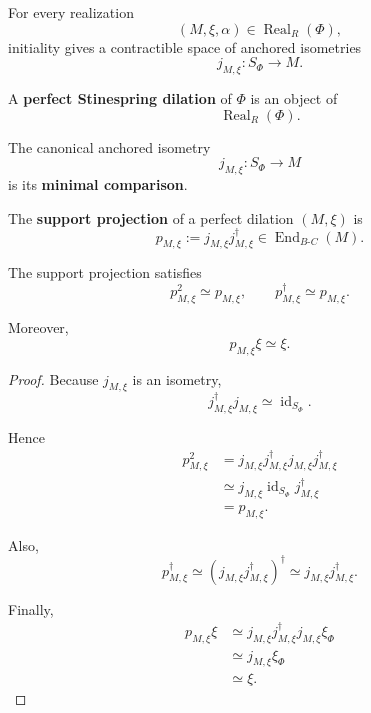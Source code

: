 For every realization
\[
  (M,\xi,\alpha)
  \in
  \operatorname{Real}_R(\Phi),
\]
initiality gives a contractible space of anchored isometries
\[
  j_{M,\xi}:
  S_\Phi\to M.
\]

\begin{definition}
\label{def:higher-perfect-stinespring-dilation}
A \textbf{perfect Stinespring dilation} of \(\Phi\) is an object of
\[
  \operatorname{Real}_R(\Phi).
\]

The canonical anchored isometry
\[
  j_{M,\xi}:S_\Phi\to M
\]
is its \textbf{minimal comparison}.
\end{definition}

\begin{definition}
\label{def:higher-support-projection}
The \textbf{support projection} of a perfect dilation \((M,\xi)\) is
\[
  p_{M,\xi}
  :=
  j_{M,\xi}j_{M,\xi}^\dagger
  \in
  \operatorname{End}_{B\text{-}C}(M).
\]
\end{definition}

\begin{proposition}
\label{prop:higher-support-projection-calculus}
The support projection satisfies
\[
  p_{M,\xi}^2
  \simeq
  p_{M,\xi},
  \qquad
  p_{M,\xi}^\dagger
  \simeq
  p_{M,\xi}.
\]

Moreover,
\[
  p_{M,\xi}\xi
  \simeq
  \xi.
\]
\end{proposition}

\begin{proof}
Because \(j_{M,\xi}\) is an isometry,
\[
  j_{M,\xi}^\dagger j_{M,\xi}
  \simeq
  \operatorname{id}_{S_\Phi}.
\]

Hence
\[
\begin{aligned}
  p_{M,\xi}^2
  &=
  j_{M,\xi}j_{M,\xi}^\dagger
  j_{M,\xi}j_{M,\xi}^\dagger
  \\
  &\simeq
  j_{M,\xi}
  \operatorname{id}_{S_\Phi}
  j_{M,\xi}^\dagger
  \\
  &=
  p_{M,\xi}.
\end{aligned}
\]

Also,
\[
  p_{M,\xi}^\dagger
  \simeq
  (j_{M,\xi}j_{M,\xi}^\dagger)^\dagger
  \simeq
  j_{M,\xi}j_{M,\xi}^\dagger.
\]

Finally,
\[
\begin{aligned}
  p_{M,\xi}\xi
  &\simeq
  j_{M,\xi}j_{M,\xi}^\dagger
  j_{M,\xi}\xi_\Phi
  \\
  &\simeq
  j_{M,\xi}\xi_\Phi
  \\
  &\simeq
  \xi.
\end{aligned}
\]
\end{proof}

